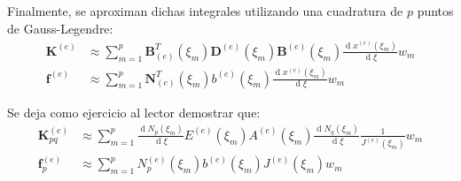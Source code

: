\documentclass[12pt,letterpaper]{article}
\newcommand{\ma}[1]{{\boldsymbol{#1}}}
\newcommand{\dd}{\operatorname{d} \!}
\begin{document}
Finalmente, se aproximan dichas integrales utilizando una cuadratura de $p$ puntos de Gauss-Legendre:
\begin{align}
\ma{K}^{(e)} &\approx \sum_{m=1}^p \ma{B}_{(e)}^T(\xi_m) \ma{D}^{(e)}(\xi_m) \ma{B}^{(e)}(\xi_m) \frac{\dd x^{(e)}(\xi_m)}{\dd \xi} w_m\\
\ma{f}^{(e)} &\approx \sum_{m=1}^p  \ma{N}_{(e)}^T(\xi_m) b^{(e)}(\xi_m) \frac{\dd x^{(e)}(\xi_m)}{\dd \xi} w_m
\end{align}

Se deja como ejercicio al lector demostrar que:
\begin{align}
\ma{K}^{(e)}_{pq} &\approx \sum_{m=1}^p \frac{\dd N_p(\xi_m)}{\dd \xi} E^{(e)}(\xi_m) A^{(e)}(\xi_m) \frac{\dd N_q(\xi_m)}{\dd \xi} \frac{1}{J^{(e)}(\xi_m)} w_m\\
\ma{f}^{(e)}_p &\approx \sum_{m=1}^p  N_p^{(e)}(\xi_m) b^{(e)}(\xi_m) J^{(e)}(\xi_m) w_m
\end{align}
\end{document}

